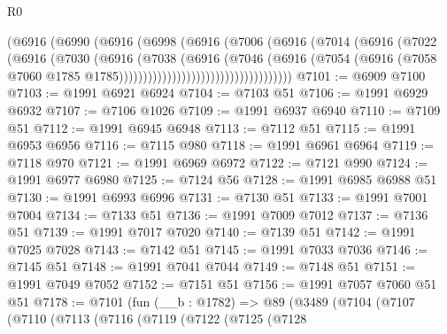 \begin{lexlean}{R0}
\begin{coremodule}
                                    (@6916
                                      (@6990
                                        (@6916
                                          (@6998
                                            (@6916
                                              (@7006
                                                (@6916
                                                  (@7014
                                                    (@6916
                                                      (@7022
                                                        (@6916
                                                          (@7030
                                                            (@6916
                                                              (@7038
                                                                (@6916
                                                                  (@7046
                                                                    (@6916
                                                                      (@7054
                                                                        (@6916
                                                                          (@7058
                                                                            @7060
                                                                            @1785
                                                                            @1785))))))))))))))))))))))))))))))))))))
@7101 := @6909 @7100
@7103 := @1991 @6921 @6924
@7104 := @7103 @51
@7106 := @1991 @6929 @6932
@7107 := @7106 @1026
@7109 := @1991 @6937 @6940
@7110 := @7109 @51
@7112 := @1991 @6945 @6948
@7113 := @7112 @51
@7115 := @1991 @6953 @6956
@7116 := @7115 @980
@7118 := @1991 @6961 @6964
@7119 := @7118 @970
@7121 := @1991 @6969 @6972
@7122 := @7121 @990
@7124 := @1991 @6977 @6980
@7125 := @7124 @56
@7128 := @1991 @6985 @6988 @51
@7130 := @1991 @6993 @6996
@7131 := @7130 @51
@7133 := @1991 @7001 @7004
@7134 := @7133 @51
@7136 := @1991 @7009 @7012
@7137 := @7136 @51
@7139 := @1991 @7017 @7020
@7140 := @7139 @51
@7142 := @1991 @7025 @7028
@7143 := @7142 @51
@7145 := @1991 @7033 @7036
@7146 := @7145 @51
@7148 := @1991 @7041 @7044
@7149 := @7148 @51
@7151 := @1991 @7049 @7052
@7152 := @7151 @51
@7156 := @1991 @7057 @7060 @51 @51
@7178 := @7101
    (fun (__b : @1782) =>
    @89
      (@3489
        (@7104
          (@7107
            (@7110
              (@7113
                (@7116
                  (@7119
                    (@7122
                      (@7125
                        (@7128

\end{coremodule}
\end{lexlean}
